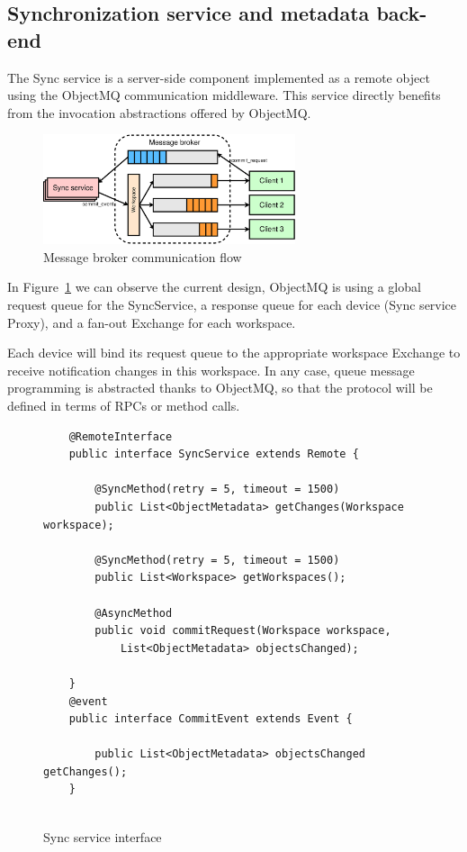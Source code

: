 \subsection{Synchronization service and metadata back-end}

The Sync service is a server-side component implemented as a remote object using the ObjectMQ communication middleware. This service directly benefits from the invocation abstractions offered by ObjectMQ. 

\begin{figure}[t]
\centering
\includegraphics[width=0.66\textwidth]{figures/message_broker}
\caption{Message broker communication flow}\label{fig:message_broker}
\end{figure}


In Figure~\ref{fig:message_broker} we can observe the current design, ObjectMQ is using a global request queue for the SyncService, 
a response queue for each device (Sync service Proxy), and a fan-out Exchange for each workspace.  

Each device will bind its request queue to the appropriate workspace Exchange to receive notification changes in this workspace.  In any case, queue message programming is abstracted thanks to ObjectMQ, so that the protocol will be defined in terms of RPCs or method calls.


\bigskip
\begin{figure}[h!]
	\begin{lstlisting}
	@RemoteInterface
	public interface SyncService extends Remote {

    	@SyncMethod(retry = 5, timeout = 1500)
    	public List<ObjectMetadata> getChanges(Workspace workspace);

    	@SyncMethod(retry = 5, timeout = 1500)
    	public List<Workspace> getWorkspaces();

    	@AsyncMethod
    	public void commitRequest(Workspace workspace, 
    		List<ObjectMetadata> objectsChanged);

	}
	@event
	public interface CommitEvent extends Event {
		
		public List<ObjectMetadata> objectsChanged getChanges();
	}
	
		\end{lstlisting}
		\caption{Sync service interface}
		\label{fig:idl}
\label{Code:push}
\vspace{-10pt}
\end{figure}


